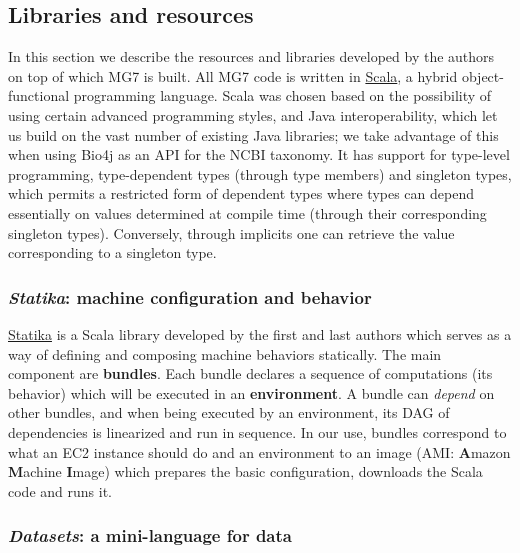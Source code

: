 \documentclass{frontiersSCNS} %
\begin{document}
\subsection{Libraries and resources}\label{libraries-and-resources}

In this section we describe the resources and libraries developed by the
authors on top of which MG7 is built. All MG7 code is written in
\href{http://www.scala-lang.org/}{Scala}, a hybrid object-functional
programming language. Scala was chosen based on the possibility of using
certain advanced programming styles, and Java interoperability, which
let us build on the vast number of existing Java libraries; we take
advantage of this when using Bio4j as an API for the NCBI taxonomy. It
has support for type-level programming, type-dependent types (through
type members) and singleton types, which permits a restricted form of
dependent types where types can depend essentially on values determined
at compile time (through their corresponding singleton types).
Conversely, through implicits one can retrieve the value corresponding
to a singleton type.

\subsubsection{\texorpdfstring{\emph{Statika}: machine configuration and
behavior}{Statika: machine configuration and behavior}}\label{statika-machine-configuration-and-behavior}

\href{https://github.com/ohnosequences/statika}{Statika} is a Scala
library developed by the first and last authors which serves as a way of
defining and composing machine behaviors statically. The main component
are \textbf{bundles}. Each bundle declares a sequence of computations
(its behavior) which will be executed in an \textbf{environment}. A
bundle can \emph{depend} on other bundles, and when being executed by an
environment, its DAG of dependencies is linearized and run in sequence.
In our use, bundles correspond to what an EC2 instance should do and an
environment to an image (AMI: \textbf{A}mazon \textbf{M}achine
\textbf{I}mage) which prepares the basic configuration, downloads the
Scala code and runs it.

\subsubsection{\texorpdfstring{\emph{Datasets}: a mini-language for
data}{Datasets: a mini-language for data}}\label{datasets-a-mini-language-for-data}
\end{document}
